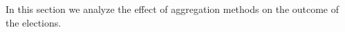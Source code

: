 \documentclass[runningheads]{llncs}
\newcommand{\kibitz}[2]{\ifnum\Comments=1{\color{#1}{#2}}\fi}
\newcommand{\rf}[1]{\kibitz{blue}{[Roy says:#1]}}
\newcommand{\mes}{ES}
\begin{document}
\label{sec:aggregation}
In  this section we  analyze the effect of aggregation methods  on the outcome of the elections.







\end{document}
